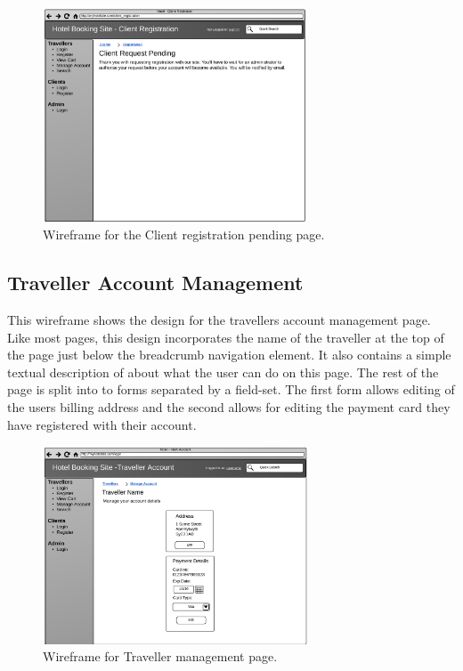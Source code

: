 \documentclass{article}
\begin{document}
\begin{figure}[H]
\centering
\includegraphics[width=0.7\textwidth]{img/wireframes/ClientPending.png}
\caption{Wireframe for the Client registration pending page.}
\label{fig:wireframe-client-pending}
\end{figure}

\subsection{Traveller Account Management}
This wireframe shows the design for the travellers account management page. Like most pages, this design incorporates the name of the traveller at the top of the page just below the breadcrumb navigation element. It also contains a simple textual description of about what the user can do on this page. The rest of the page is split into to forms separated by a field-set. The first form allows editing of the users billing address and the second allows for editing the payment card they have registered with their account.

\begin{figure}[H]
\centering
\includegraphics[width=0.7\textwidth]{img/wireframes/TravellerAccount.png}
\caption{Wireframe for Traveller management page.}
\label{fig:wireframe-client-register}
\end{figure}
\end{document}
